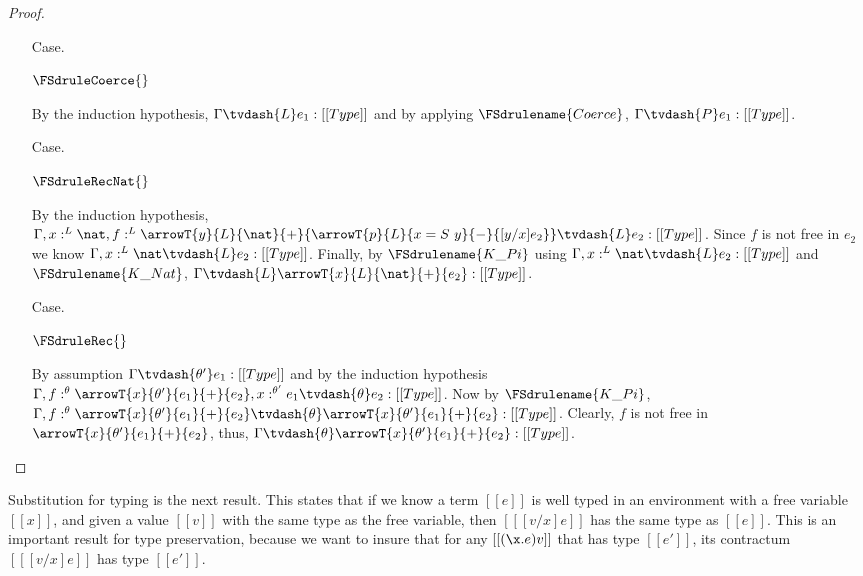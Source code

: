 \begin{proof}
\begin{itemize}
  \item[Case.] \ \\
    \begin{center}
      $\FSdruleCoerce{}$
    \end{center}
    By the induction hypothesis, $\Gamma \tvdash{L} e_1:[[Type]]$ and by applying 
    $\FSdrulename{Coerce}$, $\Gamma \tvdash{P} e_1:[[Type]]$.

  \item[Case.] \ \\
    \begin{center}
      $\FSdruleRecNat{}$
    \end{center}
    By the induction hypothesis, 
    $\Gamma, x:^L \nat,
    f:^L \arrowT{y}{L}{\nat}{+}{\arrowT{p}{L}{x=S\ y}{-}{[y/x]e_2}} \tvdash{L} e_2:[[Type]]$.  Since
    $f$ is not free in $e_2$ we know $\Gamma, x:^L \nat \tvdash{L} e_2:[[Type]]$.  Finally,
    by $\FSdrulename{K\_Pi}$ using $\Gamma, x:^L \nat \tvdash{L} e_2:[[Type]]$ and
    $\FSdrulename{K\_Nat}$, $\Gamma \tvdash{L} \arrowT{x}{L}{\nat}{+}{e_2}:[[Type]]$.


  \item[Case.] \ \\
    \begin{center}
      $\FSdruleRec{}$
    \end{center}
    By assumption $\Gamma \tvdash{\theta'} e_1:[[Type]]$ and by the induction hypothesis
    $\Gamma, f:^\theta \arrowT{x}{\theta'}{e_1}{+}{e_2},x:^{\theta'} e_1 \tvdash{\theta} e_2:[[Type]]$.
    Now by $\FSdrulename{K\_Pi}$, $\Gamma, f:^\theta \arrowT{x}{\theta'}{e_1}{+}{e_2} 
    \tvdash{\theta} \arrowT{x}{\theta'}{e_1}{+}{e_2}:[[Type]]$. Clearly, $f$ is not free in
    $\arrowT{x}{\theta'}{e_1}{+}{e_2}$, thus, 
    $\Gamma \tvdash{\theta} \arrowT{x}{\theta'}{e_1}{+}{e_2}:[[Type]]$.

  \end{itemize}
\end{proof}

Substitution for typing is the next result.  This states that if we
know a term $[[e]]$ is well typed in an environment with a free
variable $[[x]]$, and given a value $[[v]]$ with the same type as the
free variable, then $[[ [v/x]e]]$ has the same type as $[[e]]$.  This
is an important result for type preservation, because we want to
insure that for any $[[(\x.e) v]]$ that has type $[[e']]$, its
contractum $[[ [v/x]e]]$ has type $[[e']]$.

